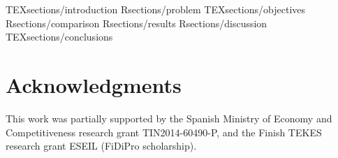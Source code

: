 \documentclass[acmsmall]{acmart}
\begin{document}
 {TEXsections/introduction}
 {Rsections/problem}
 {TEXsections/objectives}
 {Rsections/comparison}
 {Rsections/results}
 {Rsections/discussion}
 {TEXsections/conclusions}

\section{Acknowledgments}

This work was partially supported by the Spanish Ministry of Economy and Competitiveness research grant TIN2014-60490-P, and the Finish TEKES research grant ESEIL (FiDiPro scholarship).

\balance




\end{document}
